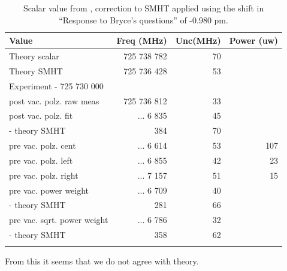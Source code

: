 \documentclass[aps,prl,
,reprint,
superscriptaddress,
onecolumn,
showpacs,preprintnumbers,
 amsmath,amssymb,
]{revtex4-1}
\begin{document}
\begin{table}[H]
\centering
\begin{tabular}{l|r|r|r}
\hline
Value                            & Freq (MHz)  & Unc(MHz) & Power (uw)  \\
\hline
Theory scalar                    & 725 738 782 & 70      &           \\
Theory SMHT                      &725 736 428 & 53      &           \\
\hline
\multicolumn{4}{l}{Experiment - 725 730 000}\\
\hline
post vac. polz. raw meas    &  725 736 812       & 33       &           \\
post vac. polz. fit         & ... 6 835       & 45       &           \\
\quad- theory SMHT                    &384      & 70      &           \\
pre vac. polz. cent         &... 6 614       & 53       & 107       \\
pre vac. polz. left         & ... 6 855       & 42       & 23        \\
pre vac. polz. right        & ... 7 157       & 51       & 15        \\
pre vac. power weight       & ... 6 709       & 40       &           \\
\quad- theory SMHT                    & 281      & 66      &           \\
pre vac. sqrt. power weight & ... 6 786       & 32       &           \\
\quad- theory SMHT                    & 358      & 62      &           \\
                                 &             &          &          
\end{tabular}
\caption{Scalar value from \cite{PhysRevA.93.052516}, correction to SMHT applied using the shift in ``Response to Bryce's questions'' of -0.980 pm.}
\end{table}

From this it seems that we do not agree with theory.
\end{document}
